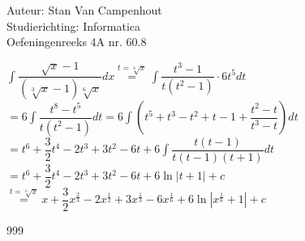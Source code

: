 \documentclass[a4paper]{article}
\begin{document}
  
\noindent \large Auteur: Stan Van Campenhout \\
\noindent \large Studierichting:  Informatica\\
\noindent \large Oefeningenreeks 4A nr. 60.8\\

\medskip

\normalsize

$ \displaystyle\int\dfrac{\sqrt{x}-1}{\left(\sqrt[3]{x}-1\right)\sqrt[6]{x}}dx \stackrel{t = \sqrt[6]{x}}{=} \displaystyle\int\dfrac{t^3-1}{t\left(t^2-1\right)}\cdot6t^5dt $\\

$ = 6\displaystyle\int\dfrac{t^8-t^5}{t\left(t^2-1\right)}dt = 6\displaystyle\int\left(t^5+t^3-t^2+t-1 + \dfrac{t^2-t}{t^3-t}\right)dt $\\

$ = t^6+\dfrac{3}{2}t^4-2t^3+3t^2-6t + 6\displaystyle\int\dfrac{t\left(t-1\right)}{t\left(t-1\right)\left(t+1\right)}dt $\\

$ = t^6+\dfrac{3}{2}t^4-2t^3+3t^2-6t + 6\ln|t+1| + c $\\ 

$ \stackrel{t = \sqrt[6]{x}}{=} x+\dfrac{3}{2}x^{\tfrac{2}{3}} -2x^{\tfrac{1}{2}} +3x^{\tfrac{1}{3}} -6x^{\tfrac{1}{6}} + 6\ln|x^{\tfrac{1}{6}} +1| + c $\\ 

\begin{thebibliography}{999}
\end{thebibliography}
\end{document}
